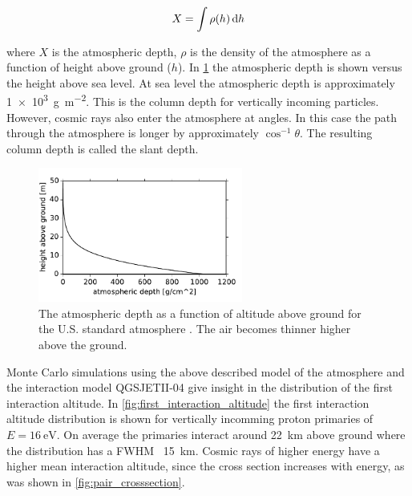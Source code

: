 \begin{equation}
    X = \int \rho(h) \mathop{}\!\mathrm{d} h
\end{equation}

where $X$ is the atmospheric depth, $\rho$ is the density of the atmosphere as a function of height above ground ($h$). In \cref{fig:atmospheric_depth} the atmospheric depth is shown versus the height above sea level. At sea level the atmospheric depth is approximately \SI{1e3}{\gram\per\meter\squared}. This is the column depth for vertically incoming particles. However, cosmic rays also enter the atmosphere at angles. In this case the path through the atmosphere is longer by approximately $\cos^{-1} \theta$. The resulting column depth is called the slant depth.

\begin{figure}
    \centering
    \includegraphics[width=0.6\textwidth]
                    {plots/cosmic-rays/atmospheric_depth}
    \caption{The atmospheric depth as a function of altitude above ground for the U.S. standard atmosphere \cite{heck2013corsika}. The air becomes thinner higher above the ground.}
    \label{fig:atmospheric_depth}
\end{figure}

Monte Carlo simulations using the above described model of the atmosphere and the interaction model QGSJETII-04 give insight in the distribution of the first interaction altitude. In \cref{fig:first_interaction_altitude} the first interaction altitude distribution is shown for vertically incomming proton primaries of $E = \SI{16}{\eV}$. On average the primaries interact around \SI{22}{\kilo\meter} above ground where the distribution has a FWHM ~\SI{15}{\kilo\meter}. Cosmic rays of higher energy have a higher mean interaction altitude, since the cross section increases with energy, as was shown in \cref{fig:pair_crosssection}.

